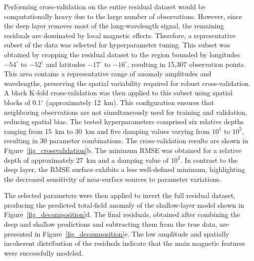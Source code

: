 \documentclass[a4paper,oneside,10pt]{book}
\begin{document}
Performing cross-validation on the entire residual dataset would be
computationally heavy due to the large number of observations.
However, since
the deep layer removes most of the long-wavelength signal, the remaining
residuals are dominated by local magnetic effects. Therefore, a
representative subset of the data was selected for hyperparameter tuning.
This subset was obtained by cropping the residual dataset to the region
bounded by longitudes $-54^{\circ}$ to $-52^{\circ}$ and latitudes
$-17^{\circ}$ to $-16^{\circ}$, resulting in 15,307 observation points. This
area contains a representative range of anomaly amplitudes and wavelengths,
preserving the spatial variability required for robust cross-validation.
A block K-fold cross-validation was then applied to this subset using spatial
blocks of 0.1$^\circ$ (approximately 12~km). This configuration ensures that neighboring
observations are not simultaneously used for training and validation,
reducing spatial bias. The tested hyperparameters comprised six relative
depths ranging from 15~km to 30~km and five damping values varying from $10^{1}$
to $10^{5}$, resulting in 30 parameter combinations.
The cross-validation results are shown in
Figure~\ref{fig_crossvalidation}b. The minimum RMSE was obtained for a relative
depth of approximately 27~km and a damping value of $10^{2}$. In contrast to
the deep layer, the RMSE surface exhibits a less well-defined minimum,
highlighting the decreased sensitivity of near-surface sources to parameter
variations.

The selected parameters were then applied to invert the full residual
dataset, producing the predicted total-field anomaly of the shallow-layer model shown in
Figure~\ref{fig_decomposition}d. The final residuals, obtained after combining
the deep and shallow predictions and subtracting them from the true data, are presented in
Figure~\ref{fig_decomposition}e. The low amplitude and spatially incoherent
distribution of the residuals indicate that the main magnetic features were
successfully modeled.
\end{document}
